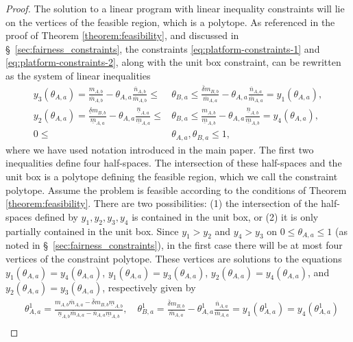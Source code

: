 \documentclass[letterpaper]{article} %
\begin{document}
\begin{proof}
The solution to a linear program  with linear inequality constraints will lie on the vertices of the feasible region, which is a polytope. As referenced in the proof of Theorem \ref{theorem:feasibility}, and discussed in \S~\ref{sec:fairness_constraints}, the constraints \eqref{eq:platform-constraints-1} and \eqref{eq:platform-constraints-2}, along with the unit box constraint, can be rewritten as the system of linear inequalities
\begin{align*}
    y_3(\theta_{A,a}) = \frac{m_{A,b}}{\overline{m}_{A,b}} - \theta_{A,a} \frac{\overline{n}_{A,b}}{\overline{m}_{A,b}} \leq &\theta_{B,a}  \leq \frac{\overline{\delta}m_{B,b}}{\overline{m}_{A,a}} - \theta_{A,a} \frac{\overline{n}_{A,a}}{\overline{m}_{A,a}}  = y_1(\theta_{A,a}), \\
    y_2(\theta_{A,a}) = \frac{\underline{\delta}m_{B,b}}{\underline{m}_{A,a}} - \theta_{A,a} \frac{\underline{n}_{A,a}}{\underline{m}_{A,a}} \leq &\theta_{B,a}  \leq \frac{m_{A,b}}{\underline{m}_{A,b}} - \theta_{A,a} \frac{\underline{n}_{A,b}}{\underline{m}_{A,b}} = y_4(\theta_{A,a}) , \\
    0 \leq &\theta_{A,a}, \theta_{B,a} \leq 1,
\end{align*}
where we have used notation introduced in the main paper. The first two inequalities define four half-spaces. The intersection of these half-spaces and the unit box is a polytope defining the feasible region, which we call the constraint polytope. Assume the problem is feasible according to the conditions of Theorem \ref{theorem:feasibility}. There are two possibilities: (1) the intersection of the half-spaces defined by $y_1, y_2, y_3, y_4$ is contained in the unit box, or (2) it is only partially contained in the unit box. Since $y_1 > y_2$ and $y_4 > y_3$ on $0 \leq \theta_{A,a} \leq 1$ (as noted in \S~\ref{sec:fairness_constraints}), in the first case there will be at most four vertices of the constraint polytope. These vertices are solutions to the equations $y_1(\theta_{A,a}) = y_4(\theta_{A,a})$, $y_1(\theta_{A,a}) = y_3(\theta_{A,a})$, $y_2(\theta_{A,a}) = y_4(\theta_{A,a})$, and $y_2(\theta_{A,a}) = y_3(\theta_{A,a})$, respectively given by
\begin{align*}
    &\theta_{A,a}^1 = \frac{m_{A,b}\overline{m}_{A,a} - \overline{\delta}m_{B,b}\underline{m}_{A,b}}
    {\underline{n}_{A,b}\overline{m}_{A,a} - \overline{n}_{A,a}\underline{m}_{A,b}} , \quad
    \theta_{B,a}^1 = \frac{\overline{\delta} m_{B,b}}{\overline{m}_{A,a}} - \theta_{A,a}^1 \frac{\overline{n}_{A,a}}{\overline{m}_{A,a}} = y_1(\theta_{A,a}^1) = y_4(\theta_{A,a}^1)\\

\end{align*}
\end{proof}
\end{document}
